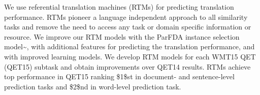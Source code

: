 We use referential translation machines (RTMs) for predicting translation performance. RTMs pioneer a language independent approach to all similarity tasks and remove the need to access any task or domain specific information or resource. We improve our RTM models with the ParFDA instance selection model{\textasciitilde}\cite{Bicici:FDA54FDA:WMT15}, with additional features for predicting the translation performance, and with improved learning models. We develop RTM models for each WMT15 QET (QET15) subtask and obtain improvements over QET14 results. RTMs achieve top performance in QET15 ranking \$1\$st in document- and sentence-level prediction tasks and \$2\$nd in word-level prediction task.
